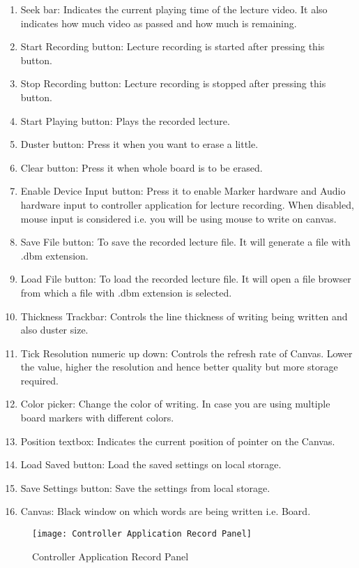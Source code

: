 \begin{enumerate}

\item Seek bar: Indicates the current playing time of the lecture video. It also indicates how much video as passed and how much is remaining.
\item Start Recording button: Lecture recording is started after pressing this button.
\item Stop Recording button: Lecture recording is stopped after pressing this button.
\item Start Playing button: Plays the recorded lecture.
\item Duster button: Press it when you want to erase a little.
\item Clear button: Press it when whole board is to be erased.
\item Enable Device Input button: Press it to enable Marker hardware and Audio hardware input to controller application for lecture recording. When disabled, mouse input is considered i.e. you will be using mouse to write on canvas.
\item Save File button: To save the recorded lecture file. It will generate a file with .dbm extension.
\item Load File button: To load the recorded lecture file. It will open a file browser from which a file with .dbm extension is selected.
\item Thickness Trackbar: Controls the line thickness of writing being written and also duster size.
\item Tick Resolution numeric up down: Controls the refresh rate of Canvas. Lower the value, higher the resolution and hence better quality but more storage required.
\item Color picker: Change the color of writing. In case you are using multiple board markers with different colors.
\item Position textbox: Indicates the current position of pointer on the Canvas. 
\item Load Saved button: Load the saved settings on local storage.
\item Save Settings button: Save the settings from local storage.
\item Canvas: Black window on which words are being written i.e. Board.

\end{enumerate}

\newpage

\begin{figure}[h]
  \centering
  \texttt{[image: Controller Application Record Panel]}
  \caption{Controller Application Record Panel}
\end{figure}

